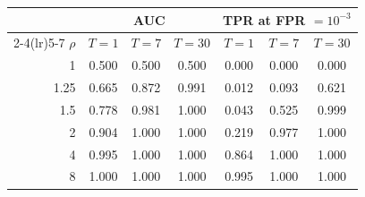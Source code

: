 \begin{tabular}{rcccccc}
\toprule
 & \multicolumn{3}{c}{AUC} & \multicolumn{3}{c}{TPR at FPR $=10^{-3}$}\\
\cmidrule(lr){2-4}\cmidrule(lr){5-7}
$\rho$ & $T{=}1$ & $T{=}7$ & $T{=}30$ & $T{=}1$ & $T{=}7$ & $T{=}30$\\
\midrule
1 & 0.500 & 0.500 & 0.500 & 0.000 & 0.000 & 0.000\\
1.25 & 0.665 & 0.872 & 0.991 & 0.012 & 0.093 & 0.621\\
1.5 & 0.778 & 0.981 & 1.000 & 0.043 & 0.525 & 0.999\\
2 & 0.904 & 1.000 & 1.000 & 0.219 & 0.977 & 1.000\\
4 & 0.995 & 1.000 & 1.000 & 0.864 & 1.000 & 1.000\\
8 & 1.000 & 1.000 & 1.000 & 0.995 & 1.000 & 1.000\\
\bottomrule
\end{tabular}
